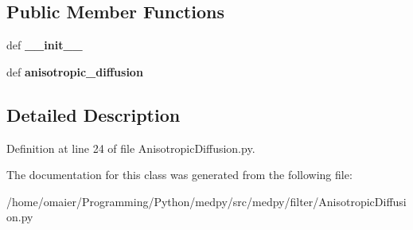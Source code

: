 \subsection*{Public Member Functions}
\begin{DoxyCompactItemize}
\item 
\hypertarget{classmedpy_1_1filter_1_1AnisotropicDiffusion_1_1AnisotropicDiffusion_a44c36411bf89fa4363f8530fd1c95e08}{
def {\bfseries \_\-\_\-init\_\-\_\-}}
\label{classmedpy_1_1filter_1_1AnisotropicDiffusion_1_1AnisotropicDiffusion_a44c36411bf89fa4363f8530fd1c95e08}

\item 
\hypertarget{classmedpy_1_1filter_1_1AnisotropicDiffusion_1_1AnisotropicDiffusion_a0570346712d774d5924136d2db5b1900}{
def {\bfseries anisotropic\_\-diffusion}}
\label{classmedpy_1_1filter_1_1AnisotropicDiffusion_1_1AnisotropicDiffusion_a0570346712d774d5924136d2db5b1900}

\end{DoxyCompactItemize}


\subsection{Detailed Description}


Definition at line 24 of file AnisotropicDiffusion.py.



The documentation for this class was generated from the following file:\begin{DoxyCompactItemize}
\item 
/home/omaier/Programming/Python/medpy/src/medpy/filter/AnisotropicDiffusion.py\end{DoxyCompactItemize}
